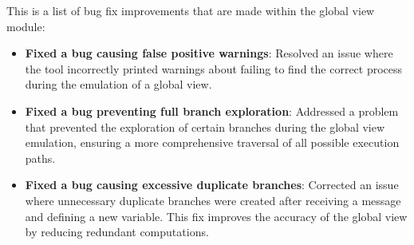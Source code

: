 This is a list of bug fix improvements that are made within the global view module:  
\begin{itemize}  
    \item \textbf{Fixed a bug causing false positive warnings}:  
    Resolved an issue where the tool incorrectly printed warnings about  
    failing to find the correct process during the emulation of a global view.  
    
    \item \textbf{Fixed a bug preventing full branch exploration}:  
    Addressed a problem that prevented the exploration of certain branches  
    during the global view emulation, ensuring a more comprehensive traversal  
    of all possible execution paths.  
    
    \item \textbf{Fixed a bug causing excessive duplicate branches}:  
    Corrected an issue where unnecessary duplicate branches were created  
    after receiving a message and defining a new variable. This fix improves  
    the accuracy of the global view by reducing redundant computations.  
\end{itemize}  